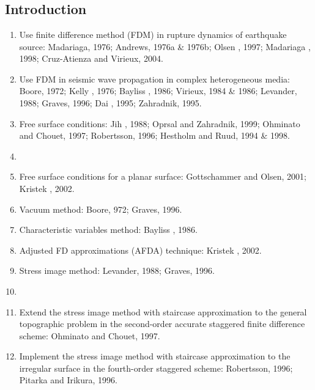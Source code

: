 \renewcommand{\pmk}{ZhangW\_2006\_GJI\_Traction image method}
\renewcommand{\prf}{WaveForward/\pmk.pdf}
\renewcommand{\pti}{Traction image method for irregular free surface boundaries in finite difference seismic wave simulation}
\renewcommand{\pay}{Wei Zhang, Xiaofei Chen, 2006}
\renewcommand{\pjo}{Geophys. J. Int.}
\renewcommand{\pda}{2016/10/29 Sat.}
\section{\pinfo}
\subsection{Introduction}
\begin{enumerate}[\hspace{10mm}*]
  \item Use finite difference method (FDM) in rupture dynamics of earthquake source: Madariaga, 1976; Andrews, 1976a \& 1976b; Olsen \etal, 1997; Madariaga \etal, 1998; Cruz-Atienza and Virieux, 2004.
  \item Use FDM in seismic wave propagation in complex heterogeneous media: Boore, 1972; Kelly \etal, 1976; Bayliss \etal, 1986; Virieux, 1984 \& 1986; Levander, 1988; Graves, 1996; Dai \etal, 1995; Zahradnik, 1995.
  \item Free surface conditions: Jih \etal, 1988; Oprsal and Zahradnik, 1999; Ohminato and Chouet, 1997; Robertsson, 1996; Hestholm and Ruud, 1994 \& 1998.
  \item \sline
  \item Free surface conditions for a planar surface: Gottschammer and Olsen, 2001; Kristek \etal, 2002.
  \item Vacuum method: Boore, 972; Graves, 1996.
  \item Characteristic variables method: Bayliss \etal, 1986.
  \item Adjusted FD approximations (AFDA) technique: Kristek \etal, 2002.
  \item Stress image method: Levander, 1988; Graves, 1996.
  \item \sline
  \item Extend the stress image method with staircase approximation to the general topographic problem in the second-order accurate staggered finite difference scheme: Ohminato and Chouet, 1997.
  \item Implement the stress image method with staircase approximation to the irregular surface in the fourth-order staggered scheme: Robertsson, 1996; Pitarka and Irikura, 1996.

\end{enumerate}
